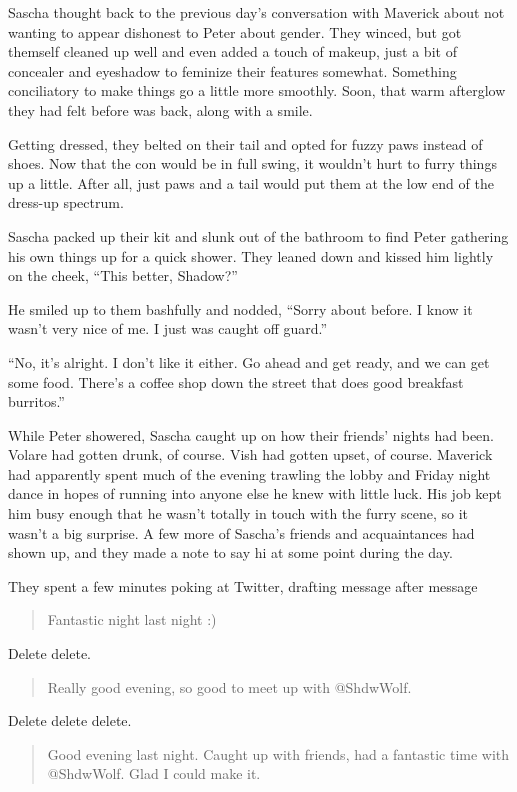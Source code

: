 Sascha thought back to the previous day's conversation with Maverick about not wanting to appear dishonest to Peter about gender. They winced, but got themself cleaned up well and even added a touch of makeup, just a bit of concealer and eyeshadow to feminize their features somewhat. Something conciliatory to make things go a little more smoothly. Soon, that warm afterglow they had felt before was back, along with a smile.

Getting dressed, they belted on their tail and opted for fuzzy paws instead of shoes. Now that the con would be in full swing, it wouldn't hurt to furry things up a little. After all, just paws and a tail would put them at the low end of the dress-up spectrum.

Sascha packed up their kit and slunk out of the bathroom to find Peter gathering his own things up for a quick shower. They leaned down and kissed him lightly on the cheek, ``This better, Shadow?''

He smiled up to them bashfully and nodded, ``Sorry about before. I know it wasn't very nice of me. I just was caught off guard.''

``No, it's alright. I don't like it either. Go ahead and get ready, and we can get some food. There's a coffee shop down the street that does good breakfast burritos.''

While Peter showered, Sascha caught up on how their friends' nights had been. Volare had gotten drunk, of course. Vish had gotten upset, of course. Maverick had apparently spent much of the evening trawling the lobby and Friday night dance in hopes of running into anyone else he knew with little luck. His job kept him busy enough that he wasn't totally in touch with the furry scene, so it wasn't a big surprise. A few more of Sascha's friends and acquaintances had shown up, and they made a note to say hi at some point during the day.

They spent a few minutes poking at Twitter, drafting message after message

\begin{quote}
Fantastic night last night :)
\end{quote}

Delete delete.

\begin{quote}
Really good evening, so good to meet up with @ShdwWolf.
\end{quote}

Delete delete delete.

\begin{quote}
Good evening last night. Caught up with friends, had a fantastic time with @ShdwWolf. Glad I could make it.
\end{quote}

